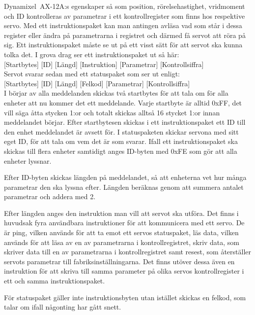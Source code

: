 \documentclass[a4paper,12pt]{article}
\begin{document}
Dynamixel~AX-12A:s egenskaper så som position, rörelsehastighet, vridmoment och ID kontrolleras av parametrar i ett kontrollregister som finns hos respektive servo. Med ett instruktionspaket kan man antingen avläsa vad som står i dessa register eller ändra på parametrarna i registret och därmed få servot att röra på sig. Ett instruktionspaket måste se ut på ett visst sätt för att servot ska kunna tolka det. I grova drag ser ett instruktionspaket ut så här:\\

[Startbytes] [ID] [Längd] [Instruktion] [Parametrar] [Kontrollsiffra]\\

Servot svarar sedan med ett statuspaket som ser ut enligt:\\

[Startbytes] [ID] [Längd] [Felkod] [Parametrar] [Kontrollsiffra]\\

I börjar av alla meddelanden skickas två startbytes för att tala om för alla enheter att nu kommer det ett meddelande. Varje startbyte är alltid 0xFF, det vill säga åtta stycken 1:or och totalt skickas alltså 16 stycket 1:or innan meddelandet börjar. Efter startbytesen skickas i ett instruktionspaket ett ID till den enhet meddelandet är avsett för. I statuspaketen skickar servona med sitt eget ID, för att tala om vem det är som svarar. Ifall ett instruktionspaket ska skickas till flera enheter samtidigt anges ID-byten med 0xFE som gör att alla enheter lyssnar. 

Efter ID-byten skickas längden på meddelandet, så att enheterna vet hur många parametrar den ska lyssna efter. Längden beräknas genom att summera antalet parametrar och addera med 2.

Efter längden anges den instruktion man vill att servot ska utföra. Det finns i huvudsak fyra användbara instruktioner för att kommunicera med ett servo. De är ping, vilken används för att ta emot ett servos statuspaket, läs data, vilken används för att läsa av en av parametrarna i kontrollregistret, skriv data, som skriver data till en av parametrarna i kontrollregistret samt resest, som återställer servots parametrar till fabriksinställningarna. Det finns utöver dessa även en instruktion för att skriva till samma parameter på olika servos kontrollregister i ett och samma instruktionspaket. 

För statuspaket gäller inte instruktionsbyten utan istället skickas en felkod, som talar om ifall någonting har gått snett.
\end{document}
